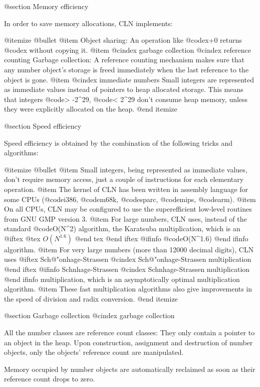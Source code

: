 @section Memory efficiency

In order to save memory allocations, CLN implements:

@itemize @bullet
@item
Object sharing: An operation like @code{x+0} returns @code{x} without copying
it.
@item
@cindex garbage collection
@cindex reference counting
Garbage collection: A reference counting mechanism makes sure that any
number object's storage is freed immediately when the last reference to the
object is gone.
@item
@cindex immediate numbers
Small integers are represented as immediate values instead of pointers
to heap allocated storage. This means that integers @code{> -2^29},
@code{< 2^29} don't consume heap memory, unless they were explicitly allocated
on the heap.
@end itemize


@section Speed efficiency

Speed efficiency is obtained by the combination of the following tricks
and algorithms:

@itemize @bullet
@item
Small integers, being represented as immediate values, don't require
memory access, just a couple of instructions for each elementary operation.
@item
The kernel of CLN has been written in assembly language for some CPUs
(@code{i386}, @code{m68k}, @code{sparc}, @code{mips}, @code{arm}).
@item
On all CPUs, CLN may be configured to use the superefficient low-level
routines from GNU GMP version 3.
@item
For large numbers, CLN uses, instead of the standard @code{O(N^2)}
algorithm, the Karatsuba multiplication, which is an
@iftex
@tex
$O(N^{1.6})$
@end tex
@end iftex
@ifinfo
@code{O(N^1.6)}
@end ifinfo
algorithm.
@item
For very large numbers (more than 12000 decimal digits), CLN uses
@iftex
Sch{@"o}nhage-Strassen
@cindex Sch{@"o}nhage-Strassen multiplication
@end iftex
@ifinfo
Schnhage-Strassen
@cindex Schnhage-Strassen multiplication
@end ifinfo
multiplication, which is an asymptotically optimal multiplication 
algorithm.
@item
These fast multiplication algorithms also give improvements in the speed
of division and radix conversion.
@end itemize


@section Garbage collection
@cindex garbage collection

All the number classes are reference count classes: They only contain a pointer
to an object in the heap. Upon construction, assignment and destruction of
number objects, only the objects' reference count are manipulated.

Memory occupied by number objects are automatically reclaimed as soon as
their reference count drops to zero.

